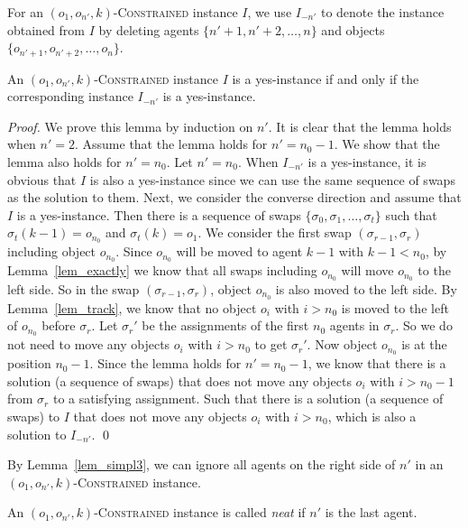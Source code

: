 For an $(o_1,o_{n'},k)$-\textsc{Constrained} instance $I$, we  use $I_{-{n'}}$ to denote the instance obtained from $I$ by deleting agents $\{n'+1,n'+2,\dots, n\}$ and objects $\{o_{n'+1},o_{n'+2},\dots, o_{n}\}$.

\begin{lemma} \label{lem_simpl3}
An $(o_1,o_{n'},k)$-\textsc{Constrained} instance $I$ is a yes-instance if and only if the corresponding instance $I_{-{n'}}$  is a yes-instance.
\end{lemma}
\begin{proof}
    We prove this lemma by induction on $n'$.
    It is clear that the lemma holds when $n'=2$. Assume that the lemma holds for $n'=n_0-1$. We show that the lemma also holds for $n'=n_0$.
    Let $n'=n_0$. When $I_{-{n'}}$  is a yes-instance, it is obvious that $I$ is also a yes-instance since we can use the same sequence of swaps as the solution to them.
    Next, we consider the converse direction and assume that $I$ is a yes-instance. Then there is a sequence of swaps $\{ \sigma_0,\sigma_1,\dots,\sigma_t\}$ such that $\sigma_t(k-1)=o_{n_0}$ and $\sigma_t(k)=o_1$.
    We consider the first swap $(\sigma_{r-1},\sigma_r)$ including object $o_{n_0}$. Since $o_{n_0}$ will be moved to agent $k-1$ with $k-1< n_0$, by Lemma~\ref{lem_exactly} we know that all swaps including $o_{n_0}$
    will move $o_{n_0}$ to the left side. So in the swap $(\sigma_{r-1},\sigma_r)$, object $o_{n_0}$ is also moved to the left side.
    By Lemma~\ref{lem_track}, we know that no object $o_i$ with $i>n_0$ is moved to the left of $o_{n_0}$ before $\sigma_r$.
    Let $\sigma_r'$ be the assignments of the first $n_0$ agents in $\sigma_r$. So
    we do not need to move any objects $o_i$ with $i>n_0$ to get $\sigma_r'$. Now object $o_{n_0}$ is at the position $n_0-1$.
    Since the lemma holds for $n'=n_0-1$, we know that there is a solution (a sequence of swaps) that does not move any objects $o_i$ with $i>n_0-1$ from $\sigma_r$ to a satisfying assignment.
    Such that there is a solution (a sequence of swaps) to $I$ that does not move any objects $o_i$ with $i>n_0$, which is also a solution to $I_{-{n'}}$. \qed
\end{proof}

By Lemma~\ref{lem_simpl3}, we can ignore all agents on the right side of $n'$ in an $(o_1,o_{n'},k)$-\textsc{Constrained} instance.

\begin{definition}
An $(o_1,o_{n'},k)$-\textsc{Constrained} instance is called \emph{neat} if $n'$ is the last agent.
\end{definition}

